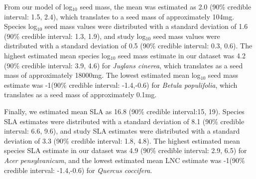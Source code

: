 \documentclass{article}\usepackage[]{graphicx}\usepackage[]{color}
\begin{document}
From our model of log$_{10}$ seed mass, the mean was estimated as 2.0 (90\% credible interval: 1.5, 2.4), which translates to a seed mass of approximately 104mg. Species log$_{10}$ seed mass values were distributed with a standard deviation  of 1.6 (90\% credible interval: 1.3, 1.9), and study log$_{10}$ seed mass values were distributed with a standard deviation  of 0.5 (90\% credible interval: 0.3, 0.6). The highest estimated mean species log$_{10}$ seed mass estimate in our dataset was 4.2 (90\% credible interval: 3.9, 4.6) for \textit{Juglans cinerea}, which translates as a seed mass of approximately 18000mg. The lowest estimated mean log$_{10}$ seed mass estimate was -1(90\% credible interval: -1.4,-0.6) for \textit{Betula populifolia}, which translates as a seed mass of approximately 0.1mg.

Finally, we estimated mean SLA as 16.8 (90\% credible interval:15, 19). Species SLA estimates were distributed with a standard deviation  of 8.1 (90\% credible interval: 6.6, 9.6), and study SLA estimates were distributed with a standard deviation  of 3.3 (90\% credible interval: 1.8, 4.8). The highest estimated mean species SLA estimate in our dataset was 4.9 (90\% credible interval: 2.9, 6.5) for \textit{Acer pensylvanicum}, and the lowest estimated mean LNC estimate was -1(90\% credible interval: -1.4,-0.6) for \textit{Quercus coccifera}.


\end{document}
